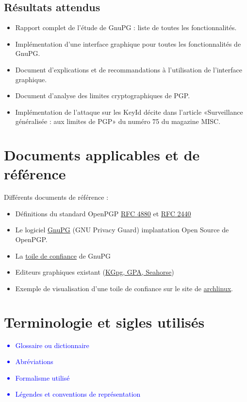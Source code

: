 \documentclass{../res/univ-projet}
\begin{document}
\subsection{Résultats attendus}
\begin{itemize}
 \item Rapport complet de l'étude de GnuPG : liste de toutes les fonctionnalités.
 \item Implémentation d'une interface graphique pour toutes les fonctionnalités de GnuPG.
 \item Document d'explications et de recommandations à l'utilisation de l'interface graphique.
 \item Document d'analyse des limites cryptographiques de PGP.
 \item Implémentation de l'attaque sur les KeyId décite dans l'article «Surveillance généralisée : aux limites de PGP» du numéro 75 du magazine MISC.
\end{itemize}



\section{Documents applicables et de référence}
Différents documents de référence :
\begin{itemize}
\item Définitions du standard OpenPGP \href{file:../../ressources/openPGP/rfc4880-en.pdf}{RFC 4880}
  et \href{file:../../ressources/openPGP/rfc2440-fr.pdf}{RFC 2440}
\item Le logiciel \href{https://www.gnupg.org/}{GnuPG} (GNU Privacy Guard) implantation Open Source
  de OpenPGP.
\item La \href{https://www.gnupg.org/gph/fr/manual.html#AEN541}{toile de confiance} de GnuPG
\item Editeurs graphiques existant 
  (\href{http://www.gnupg.org/related_software/frontends.en.html}{KGpg, GPA, Seahorse})
\item Exemple de visualisation d'une toile de confiance sur le site de 
  \href{https://www.archlinux.org/master-keys/#visualization}{archlinux}.
\end{itemize}

\section{Terminologie et sigles utilisés}
\textcolor{blue}{
  \begin{itemize}
  \item Glossaire ou dictionnaire
  \item Abréviations
  \item Formalisme utilisé
  \item Légendes et conventions de représentation
  \end{itemize}
}
\end{document}
